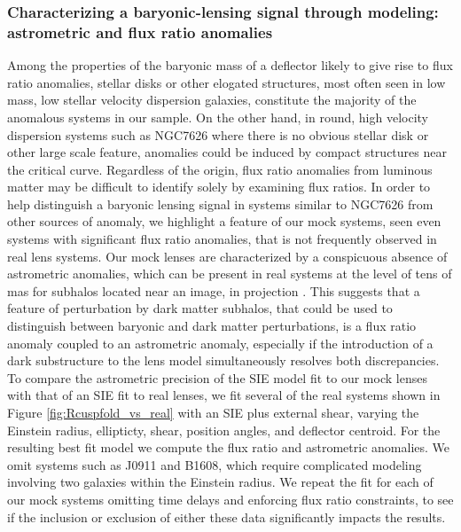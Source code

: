 \subsubsection{Characterizing a baryonic-lensing signal through modeling: astrometric and flux ratio anomalies}  

Among the properties of the baryonic mass of a deflector likely to give rise to flux ratio anomalies, stellar disks or other elogated structures, most often seen in low mass, low stellar velocity dispersion galaxies, constitute the majority of the anomalous systems in our sample. On the other hand, in round, high velocity dispersion systems such as NGC7626 where there is no obvious stellar disk or other large scale feature, anomalies could be induced by compact structures near the critical curve. Regardless of the origin, flux ratio anomalies from luminous matter may be difficult to identify solely by examining flux ratios.
\newline \indent In order to help distinguish a baryonic lensing signal in systems similar to NGC7626 from other sources of anomaly, we highlight a feature of our mock systems, seen even systems with significant flux ratio anomalies, that is not frequently observed in real lens systems. Our mock lenses are characterized by a conspicuous absence of astrometric anomalies, which can be present in real systems at the level of tens of mas for subhalos located near an image, in projection \cite{Chi02,Che++07}. This suggests that a feature of perturbation by dark matter subhalos, that could be used to distinguish between baryonic and dark matter perturbations, is a flux ratio anomaly coupled to an astrometric anomaly, especially if the introduction of a dark substructure to the lens model simultaneously resolves both discrepancies.   
\newline \indent To compare the astrometric precision of the SIE model fit to our mock lenses with that of an SIE fit to real  lenses, we fit several of the real systems shown in Figure \ref{fig:Rcuspfold_vs_real} with an SIE plus external shear, varying the Einstein radius, ellipticty, shear, position angles, and deflector centroid. For the resulting best fit model we compute the flux ratio and astrometric anomalies. We omit systems such as J0911 and B1608, which require complicated modeling involving two galaxies within the Einstein radius. We repeat the fit for each of our mock systems omitting time delays and enforcing flux ratio constraints, to see if the inclusion or exclusion of either these data significantly impacts the results.
